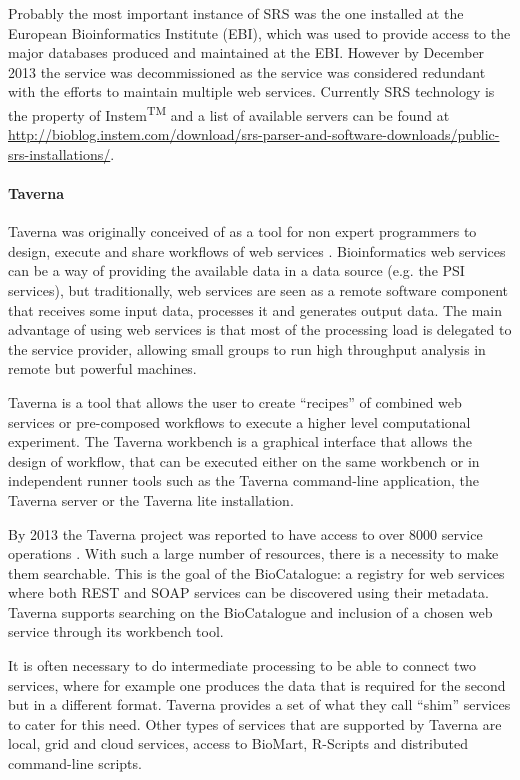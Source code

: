 Probably the most important instance of SRS was the one installed at the European Bioinformatics Institute (EBI), which was used to provide access to the major databases produced and maintained at the EBI. However by December 2013 the service was decommissioned as the service was considered redundant with the efforts to maintain multiple web services. Currently SRS technology is the property of Instem\textsuperscript{TM} and a list of available servers can be found at \url{http://bioblog.instem.com/download/srs-parser-and-software-downloads/public-srs-installations/}.

\paragraph{Taverna}
Taverna was originally conceived of as a tool for non expert programmers to design, execute and share workflows of web services \cite{HUL2006}. Bioinformatics web services can be a way of providing the available data in a data source (e.g. the PSI services), but traditionally, web services are seen as a remote software component that receives some input data, processes it and generates output data. The main advantage of using web services  is that most of the processing load is delegated to the service provider, allowing small groups to run high throughput analysis in remote but powerful machines.

Taverna is a tool that allows the user to create ``recipes'' of combined web services or pre-composed workflows to execute a higher level computational experiment. The Taverna workbench is a graphical interface that allows the design of workflow, that can be executed either on the same workbench or in independent runner tools such as the Taverna command-line application, the Taverna server or the Taverna lite installation.

By 2013 the Taverna project was reported to have access to over 8000 service operations \cite{WOL2013}. With such a large number of resources, there is a necessity to make them searchable. This is the goal of the BioCatalogue: a registry for web services where both REST and SOAP services can be discovered using their metadata. Taverna supports searching on the BioCatalogue and inclusion of a chosen web service through its workbench tool.

It is often necessary to do intermediate processing to be able to connect two services, where for example one produces the data that is required for the second but in a different format. Taverna provides a set of what they call ``shim'' services to cater for this need. Other types of services that are supported by Taverna are local, grid and cloud services, access to BioMart, R-Scripts and distributed command-line scripts.

